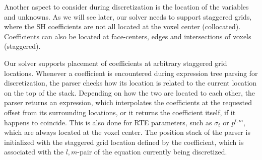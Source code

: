 Another aspect to consider during discretization is the location of the variables and unknowns. As we will see later, our solver needs to support staggered grids, where the SH coefficients are not all located at the voxel center (collocated). Coefficients can also be located at face-centers, edges and intersections of voxels (staggered).

Our solver supports placement of coefficients at arbitrary staggered grid locations. Whenever a coefficient is encountered during expression tree parsing for discretization, the parser checks how its location is related to the current location on the top of the stack. Depending on how the two are located to each other, the parser returns an expression, which interpolates the coefficients at the requested offset from its surrounding locations, or it returns the coefficient itself, if it happens to coincide. This is also done for RTE parameters, such as $\sigma_t$ or $p^{l,m}$, which are always located at the voxel center. The position stack of the parser is initialized with the staggered grid location defined by the coefficient, which is associated with the $l,m$-pair of the equation currently being discretized.






